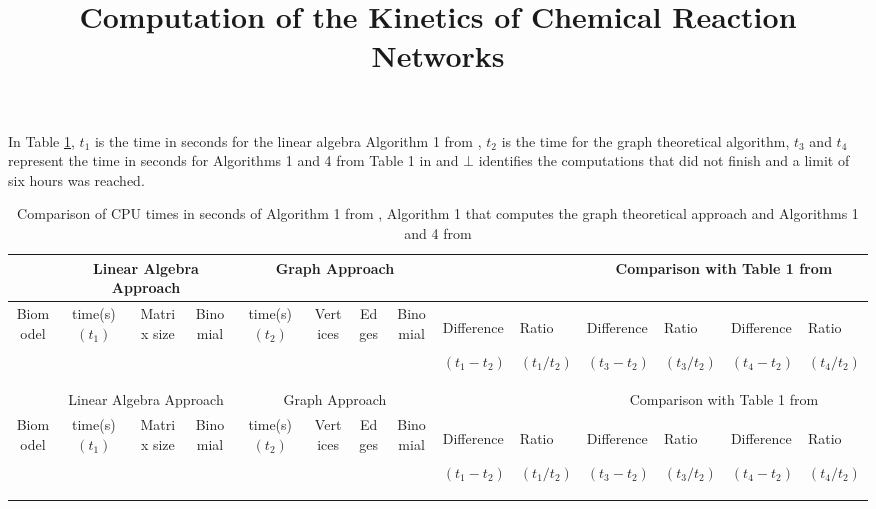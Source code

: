 \documentclass[11pt]{article}
\begin{document}
\begin{landscape}
\title{Computation of the Kinetics of Chemical Reaction Networks}
\date{}
\author{}
\maketitle

In Table \ref{t:res}, $t_{1}$ is the time in seconds for the linear algebra Algorithm 1 from \cite{rahkooy2020linear}, $t_{2}$ is the time for the graph theoretical algorithm, $t_{3}$ and $t_{4}$ represent the time in seconds for Algorithms 1 and 4 from Table 1 in \cite{grigoriev2019efficiently} and $\bot$ identifies the computations that did not finish and a limit of six hours was reached.
\setlength{\tabcolsep}{2pt}
\begin{small}
\begin{longtable}[c]{| c | c | c | c |c |c |c |c |p{1.5cm} |p{1.5cm} |p{1.5cm} |p{1.5cm} |p{1.5cm} |p{1.5cm} |}

 \caption{Comparison of CPU times in seconds of Algorithm 1 from \cite{rahkooy2020linear}, Algorithm 1 that computes the graph theoretical approach and Algorithms 1 and 4 from \cite{grigoriev2019efficiently}\label{t:res}}\\

 \hline
  & \multicolumn{3}{|c|}{Linear Algebra Approach} & \multicolumn{4}{|c|}{Graph Approach} &\multicolumn{2}{|c|}{}&\multicolumn{4}{|c|}{Comparison with Table 1 from \cite{grigoriev2019efficiently}}\\
 \hline
 Biomodel & time(s)$(t_{1})$ & Matrix size & Binomial &  time(s)$(t_{2})$ & Vertices & Edges &Binomial & Difference \par$(t_{1}-t_{2})$ & Ratio\par$(t_{1}/t_{2})$ & Difference \par$(t_{3}-t_{2})$&Ratio\par$(t_{3}/t_{2})$ &Difference\par$(t_{4}-t_{2})$ &Ratio\par$(t_{4}/t_{2})$\\
 \hline
 \endfirsthead

 \hline
 &\multicolumn{3}{|c|}{Linear Algebra Approach}& \multicolumn{4}{|c|}{Graph Approach}&\multicolumn{2}{|c|}{}&\multicolumn{4}{|c|}{Comparison with Table 1 from \cite{grigoriev2019efficiently} }\\
 \hline
 Biomodel & time(s)$(t_{1})$ & Matrix size & Binomial& time(s)$(t_{2})$ & Vertices & Edges &Binomial& Difference\par$(t_{1}-t_{2})$ & Ratio\par$(t_{1}/t_{2})$& Difference\par$(t_{3}-t_{2})$&Ratio\par$(t_{3}/t_{2})$ &Difference\par$(t_{4}-t_{2})$ &Ratio\par$(t_{4}/t_{2})$\\
 \hline
 \endhead


\end{longtable}
\end{small}
\end{landscape}
\end{document}
